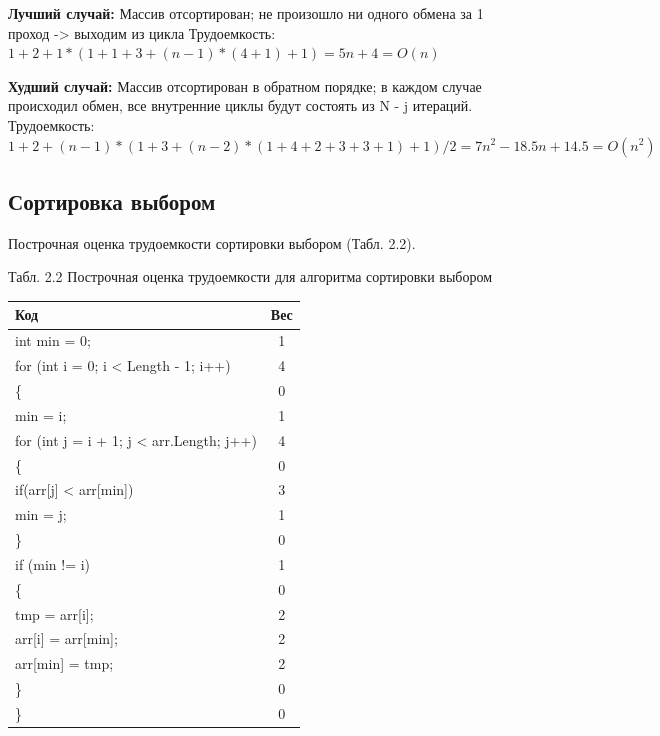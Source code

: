 \documentclass[12pt]{report}
\begin{document}
 
\textbf{Лучший случай:} Массив отсортирован; не произошло ни одного обмена за 1 проход -> выходим из цикла \newline
Трудоемкость:  $1 + 2 + 1 * (1 + 1 + 3 + (n - 1) * (4 + 1) + 1) = 5n + 4 = O(n)$

\textbf{Худший случай:}  Массив отсортирован в обратном порядке; в каждом случае происходил обмен, все внутренние циклы будут состоять из N - j итераций.\newline
Трудоемкость: $1 + 2 + (n - 1) * (1 + 3 + (n - 2) * (1 + 4 + 2 + 3 + 3 + 1) + 1) / 2 = 7n^2 - 18.5n + 14.5 = O(n ^ 2)$
\newline
\newline
\newline
\subsection{Сортировка выбором}
Построчная оценка трудоемкости сортировки выбором (Табл. 2.2).
\begin{center}
Табл. 2.2 Построчная оценка трудоемкости для алгоритма сортировки выбором

	\begin{tabular}{|l c|} 
 	\hline
	Код & Вес \\ [0.5ex] 
 	\hline
 	int min = 0; & 1\\
 	\hline
	for (int i = 0; i < Length - 1; i++) & 4\\
	\hline
	\{ & 0\\
	\hline
	\quad min = i; & 1\\
 	\hline
	\quad for (int j = i + 1; j < arr.Length; j++) & 4\\
	\hline
	\quad \{ & 0\\	
	\hline
	\quad \quad if(arr[j] < arr[min]) & 3\\
    \hline
    \quad \quad \quad min = j; & 1\\
	\hline
	\quad \} & 0\\
	\hline
	\quad if (min != i) & 1\\
	\hline
	\quad \{ & 0\\
	\hline
	\quad \quad tmp = arr[i]; & 2\\
	\hline
    \quad \quad arr[i] = arr[min]; & 2\\
    \hline
    \quad \quad arr[min] = tmp; & 2\\
    \hline
	\quad \} & 0\\
	\hline
	\} & 0\\
	\hline
	\end{tabular}
\end{center}
\hspace*{5mm}
\end{document}

